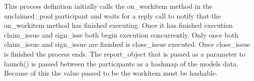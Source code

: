 This process definition initially calls the on\_workitem method in the unclaimed\_pool participant and waits for a reply call to notify that the on\_workitem method has finished executing. Once it has finished execution claim\_issue and sign\_isse both begin execution concurrently. Only once both claim\_issue and sign\_issue are finished is close\_issue executed. Once close\_issue is finished the process ends. The report\_object that is passed as a parameter to launch() is passed between the participants as a hashmap of the models data. Because of this the value passed to be the workitem must be hashable.

